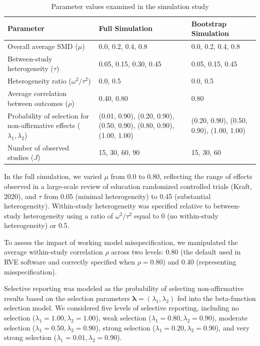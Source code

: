 \documentclass[
  american,
  man, donotrepeattitle,floatsintext]{apa7}
\begin{document}
\begin{table}
\centering
\caption{\label{tab:sim-design}Parameter values examined in the simulation study}
\centering
\begin{tabular}[t]{>{\raggedright\arraybackslash}p{2.5in}ll}
\toprule
Parameter & Full Simulation & Bootstrap Simulation\\
\midrule
Overall average SMD ($\mu$) & 0.0, 0.2, 0.4, 0.8 & 0.0, 0.2, 0.4, 0.8\\
Between-study heterogeneity ($\tau$) & 0.05, 0.15, 0.30, 0.45 & 0.05, 0.15, 0.45\\
Heterogeneity ratio ($\omega^2 / \tau^2$) & 0.0, 0.5 & 0.0, 0.5\\
Average correlation between outcomes ($\rho$) & 0.40, 0.80 & 0.80\\
Probability of selection for non-affirmative effects ($\lambda_1, \lambda_2$) & (0.01, 0.90), (0.20, 0.90), (0.50, 0.90), (0.80, 0.90), (1.00, 1.00) & (0.20, 0.90), (0.50, 0.90), (1.00, 1.00)\\
\addlinespace
Number of observed studies ($J$) & 15, 30, 60, 90 & 15, 30, 60\\
\bottomrule
\end{tabular}
\end{table}

In the full simulation, we varied \(\mu\) from 0.0 to 0.80, reflecting the range of effects observed in a large-scale review of education randomized controlled trials (Kraft, 2020), and \(\tau\) from 0.05 (minimal heterogeneity) to 0.45 (substantial heterogeneity). Within-study heterogeneity was specified relative to between-study heterogeneity using a ratio of \(\omega^2 / \tau^2\) equal to 0 (no within-study heterogeneity) or 0.5.

To assess the impact of working model misspecification, we manipulated the average within-study correlation \(\rho\) across two levels: 0.80 (the default used in RVE software and correctly specified when \(\rho = 0.80\)) and 0.40 (representing misspecification).

Selective reporting was modeled as the probability of selecting non-affirmative results based on the selection parameters \(\boldsymbol\lambda = (\lambda_1, \lambda_2)\) fed into the beta-function selection model. We considered five levels of selective reporting, including no selection (\(\lambda_1 = 1.00, \lambda_2 = 1.00\)), weak selection (\(\lambda_1 = 0.80, \lambda_2 = 0.90\)), moderate selection (\(\lambda_1 = 0.50, \lambda_2 = 0.90\)), strong selection (\(\lambda_1 = 0.20, \lambda_2 = 0.90\)), and very strong selection (\(\lambda_1 = 0.01, \lambda_2 = 0.90\)).
\end{document}
